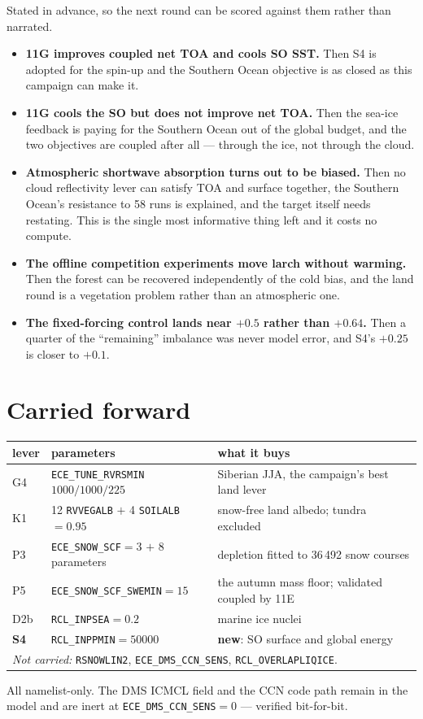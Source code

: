 \documentclass[10pt]{article}
\begin{document}
Stated in advance, so the next round can be scored against them rather than narrated.

\begin{itemize}\itemsep2pt
\item \textbf{11G improves coupled net TOA and cools SO SST.} Then S4 is adopted for the
spin-up and the Southern Ocean objective is as closed as this campaign can make it.
\item \textbf{11G cools the SO but does not improve net TOA.} Then the sea-ice feedback is
paying for the Southern Ocean out of the global budget, and the two objectives are coupled
after all --- through the ice, not through the cloud.
\item \textbf{Atmospheric shortwave absorption turns out to be biased.} Then no cloud
reflectivity lever can satisfy TOA and surface together, the Southern Ocean's resistance to
58 runs is explained, and the target itself needs restating. This is the single most
informative thing left and it costs no compute.
\item \textbf{The offline competition experiments move larch without warming.} Then the
forest can be recovered independently of the cold bias, and the land round is a vegetation
problem rather than an atmospheric one.
\item \textbf{The fixed-forcing control lands near $+0.5$ rather than $+0.64$.} Then a
quarter of the ``remaining'' imbalance was never model error, and S4's $+0.25$ is closer to
$+0.1$.
\end{itemize}

\section{Carried forward}\label{sec:config}

\begin{center}\footnotesize
\begin{tabular}{l l l}
\toprule
lever & parameters & what it buys \\
\midrule
G4 & \texttt{ECE\_TUNE\_RVRSMIN} $1000/1000/225$ & Siberian JJA, the campaign's best land lever \\
K1 & 12 \texttt{RVVEGALB} $+$ 4 \texttt{SOILALB}$=0.95$ & snow-free land albedo; tundra excluded \\
P3 & \texttt{ECE\_SNOW\_SCF}$=3$ $+$ 8 parameters & depletion fitted to 36\,492 snow courses \\
P5 & \texttt{ECE\_SNOW\_SCF\_SWEMIN}$=15$ & the autumn mass floor; validated coupled by 11E \\
D2b & \texttt{RCL\_INPSEA}$=0.2$ & marine ice nuclei \\
\textbf{S4} & \texttt{RCL\_INPPMIN}$=50000$ & \textbf{new}: SO surface and global energy \\
\midrule
\multicolumn{3}{l}{\emph{Not carried:} \texttt{RSNOWLIN2}, \texttt{ECE\_DMS\_CCN\_SENS},
\texttt{RCL\_OVERLAPLIQICE}.} \\
\bottomrule
\end{tabular}
\end{center}

\noindent All namelist-only. The DMS ICMCL field and the CCN code path remain in the model
and are inert at \texttt{ECE\_DMS\_CCN\_SENS}$=0$ --- verified bit-for-bit.
\end{document}
